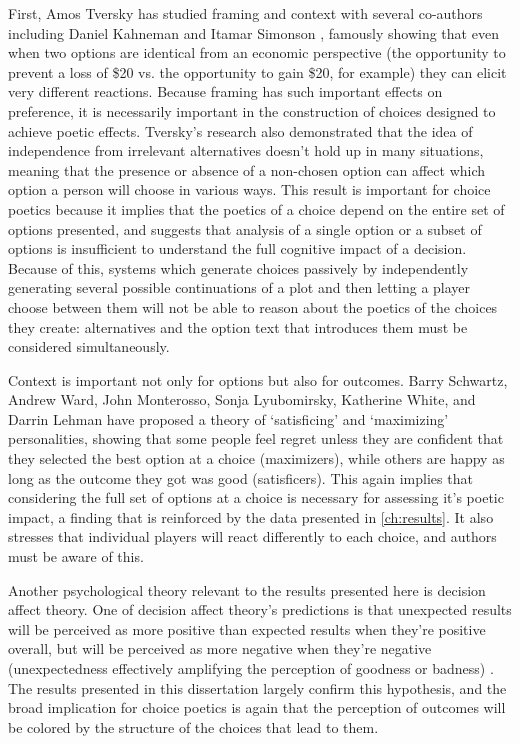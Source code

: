 First, Amos Tversky has studied framing and context with several co-authors including Daniel Kahneman \citep{Tversky1981} and Itamar Simonson \citep{Tversky1993}, famously showing that even when two options are identical from an economic perspective (the opportunity to prevent a loss of \$20 vs. the opportunity to gain \$20, for example) they can elicit very different reactions.
%
Because framing has such important effects on preference, it is necessarily important in the construction of choices designed to achieve poetic effects.
%
Tversky's research also demonstrated that the idea of independence from irrelevant alternatives doesn't hold up in many situations, meaning that the presence or absence of a non-chosen option can affect which option a person will choose in various ways.
%
This result is important for choice poetics because it implies that the poetics of a choice depend on the entire set of options presented, and suggests that analysis of a single option or a subset of options is insufficient to understand the full cognitive impact of a decision.
%
Because of this, systems which generate choices passively by independently generating several possible continuations of a plot and then letting a player choose between them will not be able to reason about the poetics of the choices they create: alternatives and the option text that introduces them must be considered simultaneously.


Context is important not only for options but also for outcomes.
%
Barry Schwartz, Andrew Ward, John Monterosso, Sonja Lyubomirsky, Katherine White, and Darrin Lehman have proposed a theory of `satisficing' and `maximizing' personalities, showing that some people feel regret unless they are confident that they selected the best option at a choice (maximizers), while others are happy as long as the outcome they got was good (satisficers).
%
This again implies that considering the full set of options at a choice is necessary for assessing it's poetic impact, a finding that is reinforced by the data presented in \cref{ch:results}.
%
It also stresses that individual players will react differently to each choice, and authors must be aware of this.


Another psychological theory relevant to the results presented here is decision affect theory.
%
One of decision affect theory's predictions is that unexpected results will be perceived as more positive than expected results when they're positive overall, but will be perceived as more negative when they're negative (unexpectedness effectively amplifying the perception of goodness or badness) \citep{Shepperd2002}.
%
The results presented in this dissertation largely confirm this hypothesis, and the broad implication for choice poetics is again that the perception of outcomes will be colored by the structure of the choices that lead to them.



